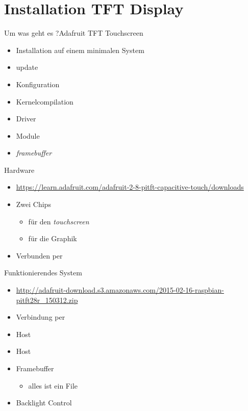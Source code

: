 \part{Installation TFT Display}
\frame{\partpage}
\begin{frame}{Um was geht es ?}{Adafruit TFT Touchscreen}
 \begin{itemize}
  \item Installation auf einem minimalen System
  \item {} update
  \item Konfiguration
  \item Kernelcompilation
  \item Driver
  \item Module
  \item {\em framebuffer}
 \end{itemize}
\end{frame}

\begin{frame}{Hardware}
 \begin{itemize}
  \item {\tiny\url{https://learn.adafruit.com/adafruit-2-8-pitft-capacitive-touch/downloads}}
  \item Zwei Chips
  \begin{itemize}
   \item {} für den {\em touchscreen}
   \item {} für die Graphik
  \end{itemize}
  \item Verbunden per 
  \end{itemize}
\end{frame}

\begin{frame}{Funktionierendes System}
\begin{itemize}
 \item {\tiny \url{http://adafruit-download.s3.amazonaws.com/2015-02-16-raspbian-pitft28r_150312.zip}}
 \item Verbindung per 
 \item Host 
 \item Host 
 \item Framebuffer 
 \begin{itemize}
  \item alles ist ein File
 \end{itemize}
 \item Backlight Control
\end{itemize}
\end{frame}

